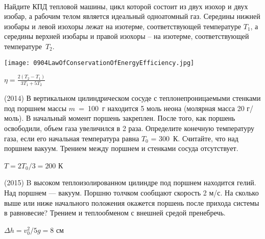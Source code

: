 \begin{ex}
\hspace{0pt} \\
\begin{minipage}{.65\textwidth}
Найдите КПД тепловой машины, цикл которой состоит из двух изохор и двух изобар, а рабочим телом является идеальный одноатомный газ. 
Середины нижней изобары и левой изохоры лежат на изотерме, соответствующей температуре $T_1$, 
а середины верхней изобары и правой изохоры -- на изотерме, соответствующей температуре~$T_2$.
\end{minipage}
\begin{minipage}{.35\textwidth}
\centering
\texttt{[image: 0904LawOfConservationOfEnergyEfficiency.jpg]}
\end{minipage}
\begin{ans}
$\eta = \frac{2(T_2-T_1)}{3T_1+5T_2}$
\end{ans}
\end{ex}

\begin{ex}
(2014) В вертикальном цилиндрическом сосуде с теплонепроницаемыми стенками под поршнем массы $m$~=~100~г находится 5 моль неона 
(молярная масса 20 г/моль). В начальный момент поршень закреплен. После того, как поршень освободили, объем газа увеличился в 2 раза. 
Определите конечную температуру газа, если его начальная температура равна $T_0$ = 300~К. Считайте, что над поршнем вакуум. 
Трением между поршнем и стенками сосуда отсутствует.
\begin{ans}
$T=2T_0/3 = 200$ К
\end{ans}
\end{ex}

\begin{ex}
(2015) B высоком теплоизолированном цилиндре под поршнем находится гелий. Над поршнем — вакуум. Поршню толчком сообщают скорость 2 м/с. На сколько выше или ниже начального положения окажется поршень после прихода системы в равновесие? Трением и теплообменом с внешней средой пренебречь.
\begin{ans}
$\Delta h = v_0^2 / 5g = 8$ см
\end{ans}
\end{ex}

